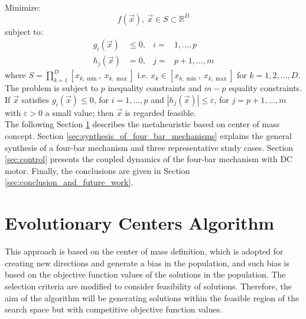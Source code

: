 \documentclass[12pt,letterpape]{article}
\begin{document}
\noindent
Minimize:
\begin{equation}
	f(\vec{x}),\ \vec{x}  \in S \subset \mathbb{R}^D
	\label{eqn:fx}
\end{equation}
%
subject to:
\begin{align*}
	g_i(\vec{x}) &\leq 0,& i =&  1 , \ldots, p \\
	h_j(\vec{x}) &= 0,& j =& p+1, \ldots, m
\end{align*}
%
where $S = \prod_{k = 1}^D  [ x_{k,\min},\ x_{k,\max} ]$ i.e. $x_k \in [ x_{k,\min},\ x_{k,\max} ]$ 
for $k = 1,2,\ldots,D$. The problem is subject to $p$ inequality constraints and 
$m - p$ equality constraints. If $\vec{x}$ satisfies $g_i( \vec{x} ) \leq 0$, for 
$i = 1, \ldots, p$ and $|h_j(\vec{x})| \leq \varepsilon$, for $j = p+1, \ldots, m$ 
with $\varepsilon > 0$ a small value; then $\vec{x}$ is regarded feasible.\\


The following Section \ref{sec:eca} describes the metaheuristic based on center
of mass concept. Section \ref{sec:synthesis_of_four_bar_mechanisms} explains the
general synthesis of a four-bar mechanism and three representative study cases.
Section \ref{sec:control} presents the coupled dynamics of the four-bar mechanism
with DC motor. Finally, the conclusions are given in Section \ref{sec:conclusion_and_future_work}.

% 
\section{Evolutionary Centers Algorithm} %
\label{sec:eca}

This approach is based on the center of mass definition, which is adopted for 
creating new directions and generate a bias in the population, and such bias is 
based on the objective function values of the solutions in the population. The 
selection criteria are modified to consider feasibility of solutions. Therefore, 
the aim of the algorithm will be generating solutions within the feasible region 
of the search space but with competitive objective function values.

%
%
\end{document}
